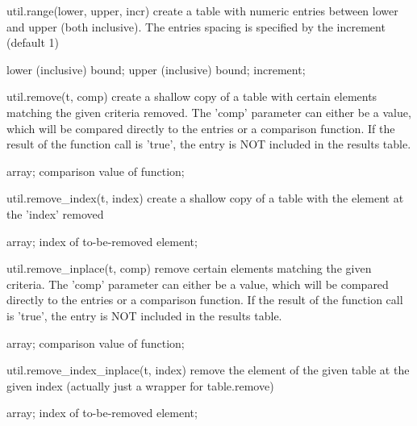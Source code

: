 \begin{APIfunc}{util.range(lower, upper, incr)}
    create a table with numeric entries between lower and upper (both inclusive). The entries spacing is specified by the increment (default 1)
    \begin{APIparameters}
            lower (inclusive) bound;
            upper (inclusive) bound;
            increment;
    \end{APIparameters}
\end{APIfunc}
\begin{APIfunc}{util.remove(t, comp)}
    create a shallow copy of a table with certain elements matching the given criteria removed. The 'comp' parameter can either be a value, which will be compared directly to the entries or a comparison function. If the result of the function call is 'true', the entry is NOT included in the results table.
    \begin{APIparameters}
            array;
            comparison value of function;
    \end{APIparameters}
\end{APIfunc}
\begin{APIfunc}{util.remove\_index(t, index)}
    create a shallow copy of a table with the element at the 'index' removed
    \begin{APIparameters}
            array;
            index of to-be-removed element;
    \end{APIparameters}
\end{APIfunc}
\begin{APIfunc}{util.remove\_inplace(t, comp)}
    remove certain elements matching the given criteria. The 'comp' parameter can either be a value, which will be compared directly to the entries or a comparison function. If the result of the function call is 'true', the entry is NOT included in the results table.
    \begin{APIparameters}
            array;
            comparison value of function;
    \end{APIparameters}
\end{APIfunc}
\begin{APIfunc}{util.remove\_index\_inplace(t, index)}
    remove the element of the given table at the given index (actually just a wrapper for table.remove)
    \begin{APIparameters}
            array;
            index of to-be-removed element;
    \end{APIparameters}
\end{APIfunc}
